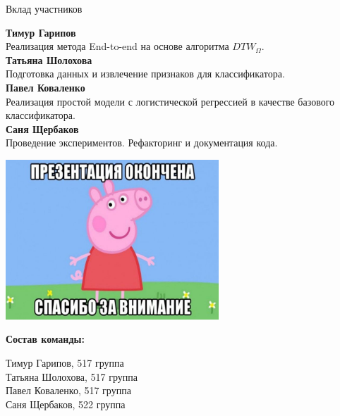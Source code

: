 \documentclass[unicode, dvipsnames]{beamer}
\begin{document}
\begin{frame}{Вклад участников}

{\bfseries Тимур Гарипов}\\ 

Реализация метода End-to-end на основе алгоритма $DTW_{\Omega}$.\\
\bigskip
{\bfseries Татьяна Шолохова}\\ 

Подготовка данных и извлечение признаков для классификатора.\\
\bigskip
{\bfseries Павел Коваленко}\\

Реализация простой модели с логистической регрессией в качестве базового классификатора.\\
\bigskip
{\bfseries Саня Щербаков} \\

Проведение экспериментов. Рефакторинг и документация кода. 

\end{frame}

\begin{frame}{}

\centering
\includegraphics[width=0.6\textwidth]{graphics/final.jpg}

\bigskip
\textbf{Состав команды:}

Тимур Гарипов, 517 группа \\ Татьяна Шолохова, 517 группа \\ Павел Коваленко, 517 группа \\ Саня Щербаков, 522 группа

\end{frame}
\end{document}
